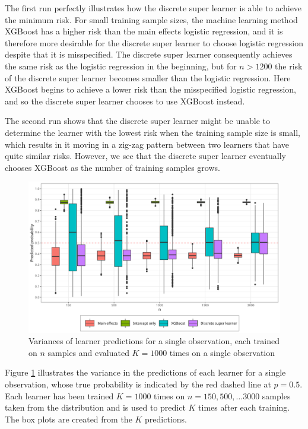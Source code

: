 \documentclass[./main.tex]{subfiles}
\begin{document}
The first run perfectly illustrates how the discrete super learner is able to achieve the minimum risk. For small training sample sizes, the machine learning method XGBoost has a higher risk than the main effects logistic regression, and it is therefore more desirable for the discrete super learner to choose logistic regression despite that it is misspecified. The discrete super learner consequently achieves the same risk as the logistic regression in the beginning, but for $ n > 1200 $ the risk of the discrete super learner becomes smaller than the logistic regression. Here XGBoost begins to achieve a lower risk than the misspecified logistic regression, and so the discrete super learner chooses to use XGBoost instead. 

The second run shows that the discrete super learner might be unable to determine the learner with the lowest risk when the training sample size is small, which results in it moving in a zig-zag pattern between two learners that have quite similar risks. However, we see that the discrete super learner eventually chooses XGBoost as the number of training samples grows.  

\begin{figure}[H]
    \centering
    \includegraphics[width=\textwidth]{figures/learner_vars.png}
    \caption{Variances of learner predictions for a single observation, each trained on $n $ samples and evaluated $ K = 1000 $ times on a single observation}
    \label{fig:pred_probs_boxplot}
\end{figure}
Figure \ref{fig:pred_probs_boxplot} illustrates the variance in the predictions of each learner for a single observation, whose true probability is indicated by the red dashed line at $ p = 0.5 $. Each learner has been trained $ K = 1000 $ times on $ n = 150, 500, \dots 3000 $ samples taken from the distribution and is used to predict $ K $ times after each training. The box plots are created from the $ K $ predictions. 
\end{document}
